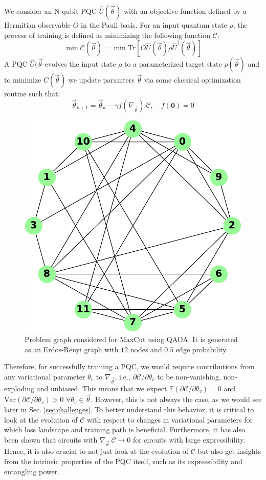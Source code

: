 \documentclass[%
 reprint,
 amsmath,
 amssymb,
 showkeys,
 pra,
 floatfix,
]{revtex4-2}
\begin{document}
We consider an N-qubit PQC $\hat{U}(\vec{\theta})$ with an objective function defined by a Hermitian observable $O$ in the Pauli basis. For an input quantum state $\rho$, the process of training is defined as minimizing the following function $\mathcal{C}$:
\begin{equation}
	\min \mathcal{C}(\vec{\theta}) = \min \text{Tr}[O \hat{U}(\vec{\theta}) \rho \hat{U}^{\dagger}(\vec{\theta})]
\end{equation}
A PQC $\hat{U}(\vec{\theta}$ evolves the input state $\rho$ to a parameterized target state $\rho(\vec{\theta})$ and to minimize $C(\vec{\theta})$ we update paramters $\vec{\theta}$ via some classical optimization routine such that:
\begin{equation}
	\vec{\theta}_{k+1} = \vec{\theta}_k - \gamma f(\nabla_{\vec{\theta}})\ \mathcal{C}, \quad f(\textbf{0})= 0 
\end{equation}
\begin{figure}[!tp]
    \centering
    \includegraphics[width=0.6\linewidth]{images/qaoa-graph.pdf}
    \caption[Problem graph for QAOA]{Problem graph considered for MaxCut using QAOA. It is generated as an Erdos-Renyi graph with $12$ nodes and $0.5$ edge probability.}
    \label{fig:qoao-maxcut-graph}
\end{figure}
Therefore, for successfully training a PQC, we would require contributions from any variational parameter $\theta_v$ to $\nabla_{\vec{\theta}}$, i.e., $\partial\mathcal{C}/\partial\theta_v$ to be non-vanishing, non-exploding and unbiased. This means that we expect $\mathbb{E}(\partial\mathcal{C}/\partial\theta_v) = 0$ and $\text{Var}(\partial\mathcal{C}/\partial\theta_v) > 0$  $\forall \theta_v \in \vec{\theta}$. However, this is not always the case, as we would see later in Sec. \ref{sec:challenges}. To better understand this behavior, it is critical to look at the evolution of $\mathcal{C}$ with respect to changes in variational parameters for which loss landscape and training path is beneficial. Furthermore, it has also been shown that circuits with $\nabla_{\vec{\theta}}\ \mathcal{C} \rightarrow 0$ for circuits with large expressibility. Hence, it is also crucial to not just look at the evolution of $\mathcal{C}$ but also get insights from the intrinsic properties of the PQC itself, such as its expressibility and entangling power.
\end{document}
